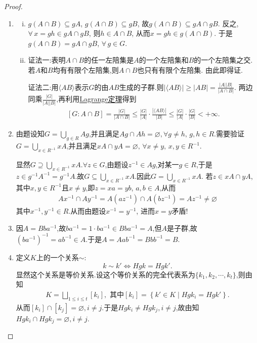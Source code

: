 \documentclass[../../main.tex]{subfiles}%
\begin{document}
\begin{proof}
\begin{enumerate}[(1)]
\item \begin{enumerate}[(i)]
\item $g(A\cap B)\subseteq gA$, $g(A\cap B)\subseteq gB$, 故$g(A\cap B)\subseteq gA\cap gB$. 反之,
$\forall\,x=gh\in gA\cap gB$, 则$h\in A\cap B$, 从而$x=gh\in g(A\cap B)$. 于是$g(A\cap B)=gA\cap gB$, $\forall\,g\in G$.

\item {\color{blue}证法一:}表明$A\cap B$的任一左陪集是$A$的一个左陪集和$B$的一个左陪集之交. 若$A$和$B$均有有限个左陪集,则$A\cap B$也只有有限个左陪集. 由此即得证.

{\color{blue}证法二:}用$\langle AB\rangle$表示$G$的由$AB$生成的子群.则$|\langle AB\rangle|\geqslant |AB|=\frac{|A||B|}{|A\cap B|}$. 两边同乘$\frac{|G|}{|A||B|}$,再利用\hyperref[theorem:抽象代数--Lagrange定理]{Lagrange定理}得到
\begin{align*}
\left[ G:A\cap B \right] =\frac{|G|}{|A\cap B|}\leqslant \frac{|G|}{|A|}\cdot \frac{|\langle AB\rangle |}{|B|}\leqslant \frac{|G|}{|A|}\cdot \frac{|G|}{|B|}<+\infty .
\end{align*}
\end{enumerate}

\item 由题设知$G=\bigcup\limits_{g\in R}Ag$,并且满足$Ag\cap Ah=\varnothing,\forall g\neq h,\,g,h\in R$.需要验证$G=\bigcup\limits_{x\in R^{-1}}xA$,并且满足$xA\cap yA=\varnothing,\,\forall x\neq y,\,x,y\in R^{-1}$.

显然$G\supseteq \bigcup\limits_{x\in R^{-1}}xA$.$\forall z\in G$,由题设$z^{-1}\in Ag$,对某一$g\in R$,于是$z\in g^{-1}A^{-1}=g^{-1}A$.故$G\subseteq \bigcup\limits_{x\in R^{-1}}xA$.因此$G = \bigcup\limits_{x\in R^{-1}}xA$.
若$z\in xA\cap yA$,其中$x,y\in R^{-1}$且$x\neq y$,即$z=xa=yb$, $a,b\in A$,从而
\begin{align*}
Ax^{-1}\cap Ay^{-1}=A(az^{-1})\cap A(bz^{-1})=Az^{-1}\neq\varnothing
\end{align*}
其中$x^{-1},y^{-1}\in R$.从而由题设$x^{-1}=y^{-1}$, 进而$x=y$矛盾!

\item 因$A=Bba^{-1}$,故$ba^{-1}=1\cdot ba^{-1}\in Bba^{-1}=A$,但$A$是子群,故$(ba^{-1})^{-1}=ab^{-1}\in A$.于是$A=Aab^{-1}=Bbb^{-1}=B$.

\item 定义$K$上的一个关系$\sim$:
$$k\sim k'\Longleftrightarrow Hgk=Hgk'.$$
显然这个关系是等价关系.设这个等价关系的完全代表系为$\{ k_1,k_2,\cdots,k_t \}$,则由知
\begin{align}
K=\bigsqcup_{1\leqslant i\leqslant t}{\left[ k_i \right]},\,\,\text{其中}\left[ k_i \right] =\left\{ k'\in K\mid Hgk_i=Hgk' \right\} .\label{eq::::-289huw8f389hw3fuszfbgnmm21.1}
\end{align}
从而$[k_i]\cap [k_j]=\varnothing,i\neq j$.于是$Hgk_i\neq Hgk_j,i\neq j$,故由知$Hgk_i\cap Hgk_j = \varnothing,i\neq j$.


\end{enumerate}
\end{proof}
\end{document}

